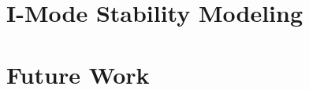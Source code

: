 \documentclass[ twoside,openright,titlepage,numbers=noenddot,headinclude,%
                footinclude=true,cleardoublepage=empty,abstractoff, %
                BCOR=5mm,paper=letter,fontsize=11pt,%
                ngerman,american,%
                ]{scrreprt}
\begin{document}
\section*{I-Mode Stability Modeling}

\section*{Future Work}


\newpage


\end{document}
